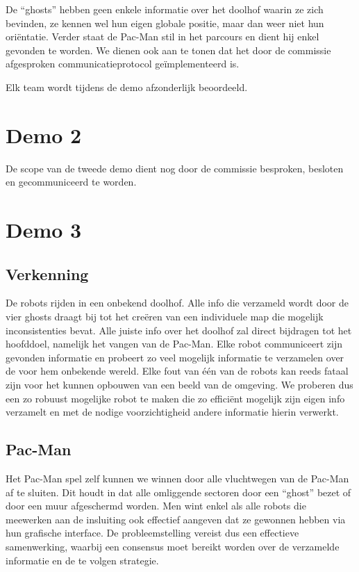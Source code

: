 \documentclass[12pt,a4paper]{report}
\begin{document}
De ``ghosts'' hebben geen enkele informatie over het doolhof waarin ze zich bevinden, ze kennen wel hun eigen globale positie, maar dan weer niet hun ori\"entatie. Verder staat de Pac-Man stil in het parcours en dient hij enkel gevonden te worden. We dienen ook aan te tonen dat het door de commissie afgesproken communicatieprotocol ge\"implementeerd is.

Elk team wordt tijdens de demo afzonderlijk beoordeeld.
 
\section{Demo 2}
 
De scope van de tweede demo dient nog door de commissie besproken, besloten en gecommuniceerd te worden.

\section{Demo 3}

\subsection{Verkenning}

De robots rijden in een onbekend doolhof. Alle info die verzameld wordt door de vier ghosts draagt bij tot het cre\"eren van een individuele map die mogelijk inconsistenties bevat. Alle juiste info over het doolhof zal direct bijdragen tot het hoofddoel, namelijk het vangen van de Pac-Man. Elke robot communiceert zijn gevonden informatie en probeert zo veel mogelijk informatie te verzamelen over de voor hem onbekende wereld. Elke fout van \'e\'en van de robots kan reeds fataal zijn voor het kunnen opbouwen van een beeld van de omgeving. We proberen dus een zo robuust mogelijke robot te maken die zo effici\"ent mogelijk zijn eigen info verzamelt en met de nodige voorzichtigheid andere informatie hierin verwerkt.

\subsection{Pac-Man}

Het Pac-Man spel zelf kunnen we winnen door alle vluchtwegen van de Pac-Man af te sluiten. Dit houdt in dat alle omliggende sectoren door een ``ghost'' bezet of door een muur afgeschermd worden. Men wint enkel als alle robots die meewerken aan de insluiting ook effectief aangeven dat ze gewonnen hebben via hun grafische interface. De probleemstelling vereist dus een effectieve samenwerking, waarbij een consensus moet bereikt worden over de verzamelde informatie en de te volgen strategie.
\end{document}

